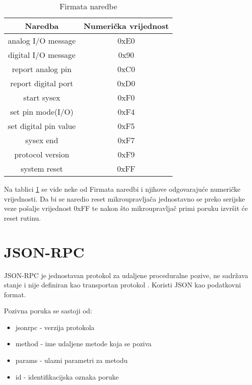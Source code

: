 \begin{table}[h]
\setlength{\tabcolsep}{18pt}
\centering
    \begin{tabular}{|c|c|}
        \hline
        Naredba               & Numerička vrijednost \\
        \hline
        analog I/O message    & 0xE0 \\
        \hline
        digital I/O message   & 0x90 \\
        \hline
        report analog pin     & 0xC0 \\
        \hline
        report digital port   & 0xD0 \\
        \hline
        start sysex           & 0xF0 \\
        \hline
        set pin mode(I/O)     & 0xF4 \\
        \hline
        set digital pin value & 0xF5 \\
        \hline
        sysex end             & 0xF7 \\
        \hline
        protocol version      & 0xF9 \\
        \hline
        system reset          & 0xFF \\
        \hline
    \end{tabular}
    \caption{Firmata naredbe}
    \label{tbl:firmata}
\end{table}

Na tablici \ref{tbl:firmata} se vide neke od Firmata naredbi i njihove
odgovarajuće numeričke vrijednosti. Da bi se naredio reset mikroupravljača
jednostavno se preko serijske veze pošalje vrijednost 0xFF te nakon što
mikroupravljač primi poruku izvršit će reset rutinu.

\newpage
\section{JSON-RPC}

JSON-RPC je jednostavan protokol za udaljene proceduralne pozive, ne sadržava
stanje i nije definiran kao transportan protokol \cite{jsonRPC}. Koristi JSON
\cite{jsonRFC} kao podatkovni format.

Pozivna poruka se sastoji od:
\begin{itemize}
        \item jsonrpc - verzija protokola
        \item method - ime udaljene metode koja se poziva
        \item params - ulazni parametri za metodu
        \item id - identifikacijska oznaka poruke
\end{itemize}

